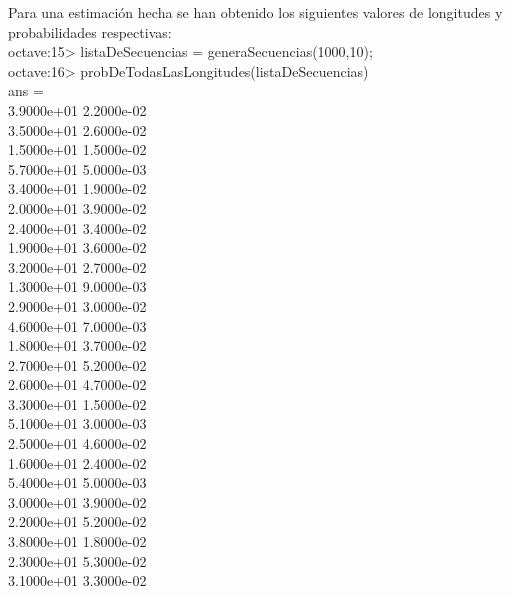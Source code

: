 \documentclass{article}
\begin{document}

\bigskip


\noindent Para una estimación hecha se han obtenido los siguientes valores de longitudes y probabilidades respectivas:\\

{\ttfamily\footnotesize
\indent octave:15> listaDeSecuencias = generaSecuencias(1000,10);\\
\indent octave:16> probDeTodasLasLongitudes(listaDeSecuencias)\\
\indent ans =\\

\indent    3.9000e+01   2.2000e-02\\
\indent    3.5000e+01   2.6000e-02\\
\indent    1.5000e+01   1.5000e-02\\
\indent    5.7000e+01   5.0000e-03\\
\indent    3.4000e+01   1.9000e-02\\
\indent    2.0000e+01   3.9000e-02\\
\indent    2.4000e+01   3.4000e-02\\
\indent    1.9000e+01   3.6000e-02\\
\indent    3.2000e+01   2.7000e-02\\
\indent    1.3000e+01   9.0000e-03\\
\indent    2.9000e+01   3.0000e-02\\
\indent    4.6000e+01   7.0000e-03\\
\indent    1.8000e+01   3.7000e-02\\
\indent    2.7000e+01   5.2000e-02\\
\indent    2.6000e+01   4.7000e-02\\
\indent    3.3000e+01   1.5000e-02\\
\indent    5.1000e+01   3.0000e-03\\
\indent    2.5000e+01   4.6000e-02\\
\indent    1.6000e+01   2.4000e-02\\
\indent    5.4000e+01   5.0000e-03\\
\indent    3.0000e+01   3.9000e-02\\
\indent    2.2000e+01   5.2000e-02\\
\indent    3.8000e+01   1.8000e-02\\
\indent    2.3000e+01   5.3000e-02\\
\indent    3.1000e+01   3.3000e-02\\
}
\end{document}
